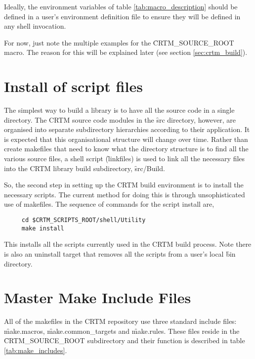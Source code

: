 Ideally, the environment variables of table \ref{tab:macro_description} should be defined in a user's environment definition file to ensure they will be defined in any shell invocation.

For now, just note the multiple examples for the \f{CRTM\_SOURCE\_ROOT} macro. The reason for this will be explained later (see section \ref{sec:crtm_build}).


\section{Install of script files}
The simplest way to build a library is to have all the source code in a single directory. The CRTM source code modules in the \f{src} directory, however, are organised into separate subdirectory hierarchies according to their application. It is expected that this organisational structure will change over time. Rather than create makefiles that need to know what the directory structure is to find all the various source files, a shell script (\f{linkfiles}) is used to link all the necessary files into the CRTM library build subdirectory, \f{src/Build}.

So, the second step in setting up the CRTM build environment is to install the necessary scripts. The current method for doing this is through unsophisticated use of makefiles. The sequence of commands for the script install are,
\begin{ttfamily}
  \begin{verbatim}
     cd $CRTM_SCRIPTS_ROOT/shell/Utility
     make install\end{verbatim}
\end{ttfamily}
This installs all the scripts currently used in the CRTM build process. Note there is also an uninstall target that removes all the scripts from a user's local \f{bin} directory.

\section{Master Make Include Files}
\label{sec:make_includes}
All of the makefiles in the CRTM repository use three standard include files: \f{make.macros}, \f{make.common\_targets} and \f{make.rules}. These files reside in the \f{CRTM\_SOURCE\_ROOT} subdirectory and their function is described in table \ref{tab:make_includes}.

